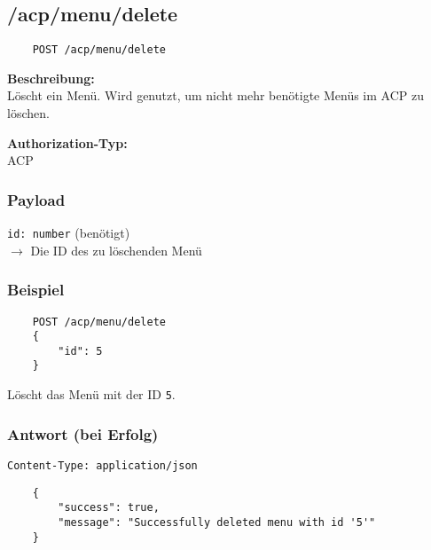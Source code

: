 \subsection{/acp/menu/delete}

\begin{lstlisting}
    POST /acp/menu/delete
\end{lstlisting}

\textbf{Beschreibung:} \\
Löscht ein Menü. Wird genutzt, um nicht mehr benötigte Menüs im ACP zu löschen.

\textbf{Authorization-Typ:} \\
ACP

\subsubsection{Payload}

\lstinline{id: number} (benötigt) \\
$\rightarrow$ Die ID des zu löschenden Menü

\subsubsection{Beispiel}

\begin{lstlisting}
    POST /acp/menu/delete
    {
        "id": 5
    }
\end{lstlisting}

Löscht das Menü mit der ID \lstinline{5}.

\subsubsection{Antwort (bei Erfolg)}

\lstinline{Content-Type: application/json}
\begin{lstlisting}
    {
        "success": true, 
        "message": "Successfully deleted menu with id '5'"
    }
\end{lstlisting}